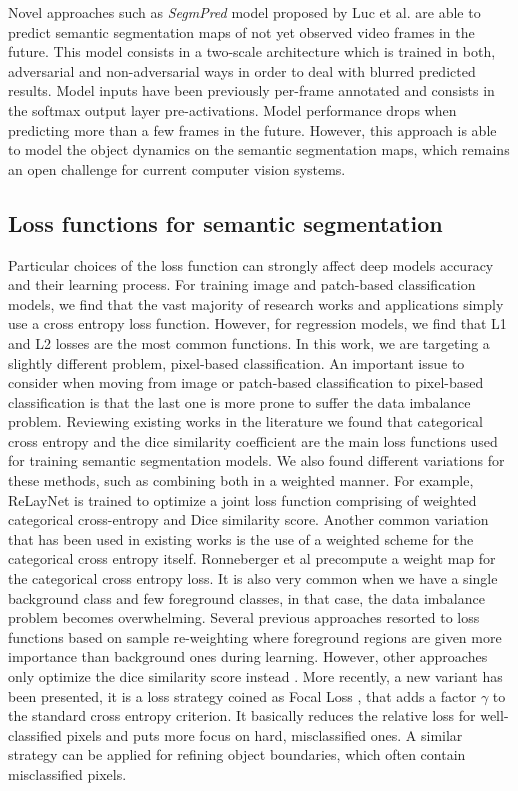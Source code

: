Novel approaches such as \emph{SegmPred} model proposed by Luc et al. \cite{Luc2017} are able to predict semantic segmentation maps of not yet observed video frames in the future. This model consists in a two-scale architecture which is trained in both, adversarial and non-adversarial ways in order to deal with blurred predicted results. Model inputs have been previously per-frame annotated and consists in the softmax output layer pre-activations. Model performance drops when predicting more than a few frames in the future. However, this approach is able to model the object dynamics on the semantic segmentation maps, which remains an open challenge for current computer vision systems.

\subsection{Loss functions for semantic segmentation}

Particular choices of the loss function can strongly affect deep models accuracy and their learning process. For training image and patch-based classification models, we find that the vast majority of research works and applications simply use a cross entropy loss function. However, for regression models, we find that L1 and L2 losses are the most common functions. In this work, we are targeting a slightly different problem, pixel-based classification. An important issue to consider when moving from image or patch-based classification to pixel-based classification is that the last one is more prone to suffer the data imbalance problem. Reviewing existing works in the literature we found that categorical cross entropy and the dice similarity coefficient are the main loss functions used for training semantic segmentation models. We also found different variations for these methods, such as combining both in a weighted manner. For example, ReLayNet \cite{Roy2017} is trained to optimize a joint loss function comprising of weighted categorical cross-entropy and Dice similarity score. Another common variation that has been used in existing works is the use of a weighted scheme for the categorical cross entropy itself. Ronneberger et al \cite{Ronneberger2015} precompute a weight map for the categorical cross entropy loss. It is also very common when we have a single background class and few foreground classes, in that case, the data imbalance problem becomes overwhelming. Several previous approaches resorted to loss functions based on sample re-weighting where foreground regions are given more importance than background ones during learning. However, other approaches only optimize the dice similarity score instead \cite{Milletari2016}. More recently, a new variant has been presented, it is a loss strategy coined as Focal Loss \cite{Lin2017b}, that adds a factor $\gamma$ to the standard cross entropy criterion. It basically reduces the relative loss for well-classified pixels and puts more focus on hard, misclassified ones. A similar strategy can be applied for refining object boundaries, which often contain misclassified pixels.
 
